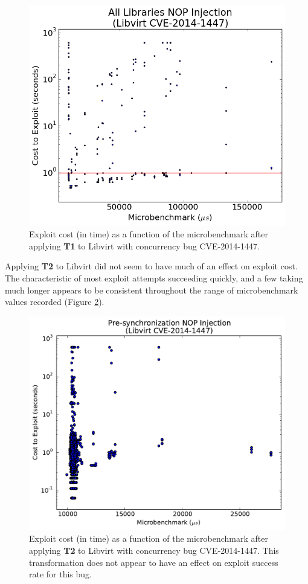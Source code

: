 \begin{figure}
	\centering
	\includegraphics[width=\columnwidth]{figures/libvirt-all}
	\caption{
		Exploit cost (in time) as a function of the microbenchmark after applying \textbf{T1} to Libvirt with concurrency bug CVE-2014-1447.
	}
	\label{fig_libvirt-all}
\end{figure}

Applying \textbf{T2} to Libvirt did not seem to have much of an effect on exploit cost.
The characteristic of most exploit attempts succeeding quickly, and a few taking much longer appears to be consistent throughout the range of microbenchmark values recorded (Figure \ref{fig_libvirt-pre}).
\begin{figure}
	\centering
	\includegraphics[width=\columnwidth]{figures/libvirt-pre}
	\caption{
		Exploit cost (in time) as a function of the microbenchmark after applying \textbf{T2} to Libvirt with concurrency bug CVE-2014-1447.
		This transformation does not appear to have an effect on exploit success rate for this bug.
	}
	\label{fig_libvirt-pre}
\end{figure}

